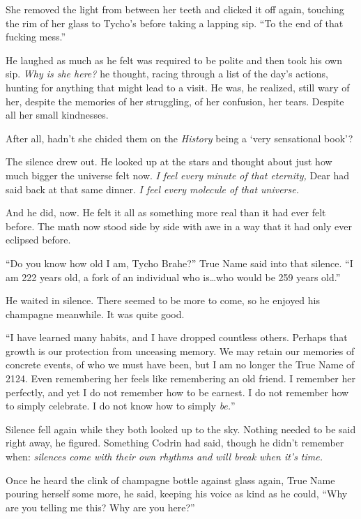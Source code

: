 She removed the light from between her teeth and clicked it off again, touching the rim of her glass to Tycho's before taking a lapping sip. ``To the end of that fucking mess.''

He laughed as much as he felt was required to be polite and then took his own sip. \emph{Why is she here?} he thought, racing through a list of the day's actions, hunting for anything that might lead to a visit. He was, he realized, still wary of her, despite the memories of her struggling, of her confusion, her tears. Despite all her small kindnesses.

After all, hadn't she chided them on the \emph{History} being a `very sensational book'?

The silence drew out. He looked up at the stars and thought about just how much bigger the universe felt now. \emph{I feel every minute of that eternity,} Dear had said back at that same dinner. \emph{I feel every molecule of that universe.}

And he did, now. He felt it all as something more real than it had ever felt before. The math now stood side by side with awe in a way that it had only ever eclipsed before.

``Do you know how old I am, Tycho Brahe?'' True Name said into that silence. ``I am 222 years old, a fork of an individual who is\ldots who would be 259 years old.''

He waited in silence. There seemed to be more to come, so he enjoyed his champagne meanwhile. It was quite good.

``I have learned many habits, and I have dropped countless others. Perhaps that growth is our protection from unceasing memory. We may retain our memories of concrete events, of who we must have been, but I am no longer the True Name of 2124. Even remembering her feels like remembering an old friend. I remember her perfectly, and yet I do not remember how to be earnest. I do not remember how to simply celebrate. I do not know how to simply \emph{be.}''

Silence fell again while they both looked up to the sky. Nothing needed to be said right away, he figured. Something Codrin had said, though he didn't remember when: \emph{silences come with their own rhythms and will break when it's time.}

Once he heard the clink of champagne bottle against glass again, True Name pouring herself some more, he said, keeping his voice as kind as he could, ``Why are you telling me this? Why are you here?''

